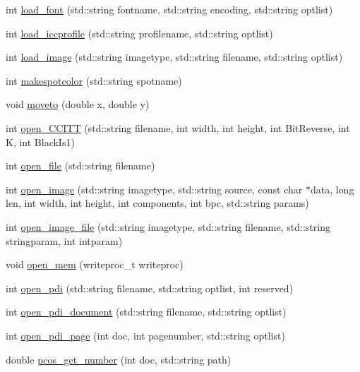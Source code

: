 \begin{DoxyCompactItemize}
\item 
int \hyperlink{classPDFlib_a7a3fb08e85e9adbe33b834c82d9a7546}{load\+\_\+font} (std\+::string fontname, std\+::string encoding, std\+::string optlist)
\item 
int \hyperlink{classPDFlib_a0e9a54de242086ebd19748c3ecf3a47d}{load\+\_\+iccprofile} (std\+::string profilename, std\+::string optlist)
\item 
int \hyperlink{classPDFlib_a6d69dea52622a7af8d6231e1ada76139}{load\+\_\+image} (std\+::string imagetype, std\+::string filename, std\+::string optlist)
\item 
int \hyperlink{classPDFlib_ad593e18f817501af814242eebe39902b}{makespotcolor} (std\+::string spotname)
\item 
void \hyperlink{classPDFlib_a4b04a1be188fcb180132f2aa4f0a357c}{moveto} (double x, double y)
\item 
int \hyperlink{classPDFlib_ad680c8f235044b05c2299f35facbe1a4}{open\+\_\+\+C\+C\+I\+T\+T} (std\+::string filename, int width, int height, int Bit\+Reverse, int K, int Black\+Is1)
\item 
int \hyperlink{classPDFlib_ad3b48373b17c17a9e8b491ef1da40bdf}{open\+\_\+file} (std\+::string filename)
\item 
int \hyperlink{classPDFlib_aaf45ace35fe6f1b149f4f8d729dbd612}{open\+\_\+image} (std\+::string imagetype, std\+::string source, const char $\ast$data, long len, int width, int height, int components, int bpc, std\+::string params)
\item 
int \hyperlink{classPDFlib_a11741eafa900b4490097cb913709b984}{open\+\_\+image\+\_\+file} (std\+::string imagetype, std\+::string filename, std\+::string stringparam, int intparam)
\item 
void \hyperlink{classPDFlib_a2ec7cc181d64f7baa8d08e74f2824ab8}{open\+\_\+mem} (writeproc\+\_\+t writeproc)
\item 
int \hyperlink{classPDFlib_a13d36d30ea9a98394589977fe877ae47}{open\+\_\+pdi} (std\+::string filename, std\+::string optlist, int reserved)
\item 
int \hyperlink{classPDFlib_a0d18c17852e877905ab0310ecf1e0b37}{open\+\_\+pdi\+\_\+document} (std\+::string filename, std\+::string optlist)
\item 
int \hyperlink{classPDFlib_ae1e065f5dcb8e50aad847deca22b8841}{open\+\_\+pdi\+\_\+page} (int doc, int pagenumber, std\+::string optlist)
\item 
double \hyperlink{classPDFlib_a639288411ee0b9e98ffbdb34434f05ed}{pcos\+\_\+get\+\_\+number} (int doc, std\+::string path)

\end{DoxyCompactItemize}
